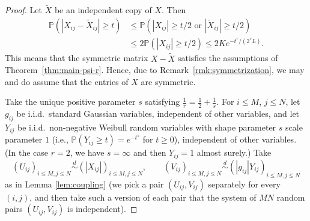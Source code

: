 \documentclass[a4paper]{amsart}
\theoremstyle{definition}
\theoremstyle{remark}
\numberwithin{equation}{section}
\newcommand*{\PP}{\mathbb{P}}
\newcommand*{\eqdistr}{\overset{d}{\sim}} %
\begin{document}
\begin{proof}
	Let $\widetilde{X}$ be an independent copy of $X$. Then 
	\begin{align*}
	\PP(|X_{ij}-\widetilde{X}_{ij}|\ge t) &\le \PP(|X_{ij}|\ge t/2 \text{ or } |\widetilde{X}_{ij}|\ge t/2) 
	\\
	&\le 2 \PP(|X_{ij}|\ge t/2) \le 2Ke^{-t^r/(2^rL)}.
	\end{align*}
	This means that the symmetric matrix $X-\widetilde{X}$ satisfies the assumptions of Theorem~\ref{thm:main-psi-r}. Hence, due to Remark~\ref{rmk:symmetrization}, we may and do assume that the entries of $X$ are symmetric.
	
	Take the unique positive parameter $s$ satisfying $\frac 1r = \frac 12+\frac 1s$.
	For $i\leq M$, $j\leq N$, let $g_{ij}$ be i.i.d.\ standard Gaussian variables,  independent of other variables,
	and let $Y_{ij}$ be i.i.d.\ non-negative Weibull random variables with shape parameter $s$ scale parameter $1$ (i.e., $\PP(Y_{ij}\ge t)=e^{-t^s}$ for $t\geq 0$), independent of other variables.
	(In the case $r=2$, we have $s=\infty$ and then $Y_{ij}=1$ almost surely.)
	Take
	\[ (U_{ij})_{i\leq M, j\leq N} \eqdistr (|X_{ij}|)_{i\leq M, j\leq N}, \qquad (V_{ij})_{i\leq M, j\leq N}\eqdistr ( |g_{ij}|Y_{ij})_{i\leq M, j\leq N}\]
	 as in  Lemma \ref{lem:coupling} (we pick a pair $(U_{ij}, V_{ij})$ separately for every $(i,j)$, and then take such a version of each pair that the system of $MN$ random pairs $(U_{ij}, V_{ij})$ is independent).
	

\end{proof}
\end{document}
